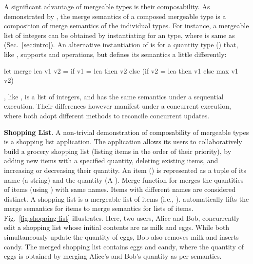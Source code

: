 A significant advantage of mergeable types is their composability. As
demonstrated by , the merge semantics of a composed mergeable
type is a composition of merge semantics of the individual types.  For
instance, a mergeable list of integers can be obtained by
instantiating  for an  type, where  is
same as  (Sec.~\ref{sec:intro}). 
An alternative instantiation of  is for a quantity type
() that, like , supports  and 
operations, but defines its  semantics a little differently:
\begin{ocaml}
let merge lca v1 v2 = if v1 = lca then v2 else (if v2 = lca then v1 else max v1 v2)
\end{ocaml}
, like , is a list of integers, and has
the same semantics under a sequential execution. Their differences
however manifest under a concurrent execution, where both adopt
different methods to reconcile concurrent updates. 


{\bf Shopping List}. A non-trivial demonstration of composability of
mergeable types is a shopping list application. The application allows
its users to collaboratively build a grocery shopping list (listing
items in the order of their priority), by adding new items with a
specified quantity, deleting existing items, and increasing or
decreasing their quantity. An item () is represented as a
tuple of its name (a string) and the quantity (A ). Merge
function for  merges the quantities of items (using
) with same names. Items with different names are
considered distinct. A shopping list is a mergeable list of items
(i.e., ).  automatically lifts the
merge semantics for items to merge semantics for lists of items.
Fig.~\ref{fig:shopping-list} illustrates. Here, two users, Alice and
Bob, concurrently edit a shopping list whose initial contents are as
milk and eggs. While both simultaneously update the quantity of eggs,
Bob also removes milk and inserts candy. The merged shopping list
contains eggs and candy, where the quantity of eggs is obtained by
merging Alice's and Bob's quantity as per  semantics.

